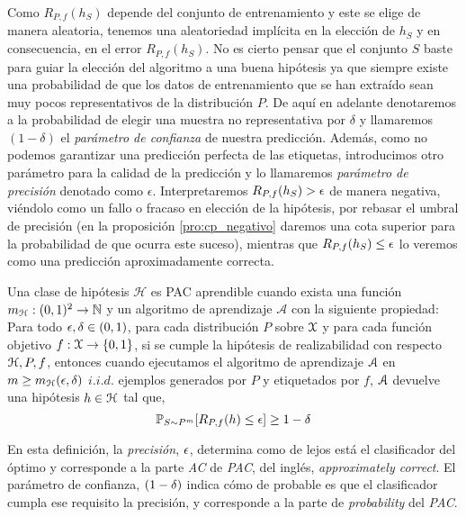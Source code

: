     Como $R_{P,f}(h_S)$ depende del conjunto de entrenamiento y este se elige de manera aleatoria, tenemos una aleatoriedad implícita en la elección de $h_S$ y en consecuencia, en el error $R_{P,f}(h_S)$. No es cierto pensar que el conjunto $S$ baste para guiar la elección del algoritmo a una buena hipótesis ya que siempre existe una probabilidad de que los datos de entrenamiento que se han extraído sean muy pocos representativos de la distribución $P$. De aquí en adelante denotaremos a la probabilidad de elegir una muestra no representativa por $\delta$ y llamaremos $(1-\delta)$ el \textit{parámetro de confianza} de nuestra predicción. Además, como no podemos garantizar una predicción perfecta de las etiquetas, introducimos otro parámetro para la calidad de la predicción y lo llamaremos \textit{parámetro de precisión} denotado como $\epsilon$. Interpretaremos $R_{P,f}(h_S) > \epsilon$ de manera negativa, viéndolo como un fallo o fracaso en elección de la hipótesis, por rebasar el umbral de precisión (en la proposición \ref{pro:cp_negativo} daremos una cota superior para la probabilidad de que ocurra este suceso), mientras que $R_{P,f}(h_S) \leq \epsilon$ lo veremos como una predicción aproximadamente correcta. \\
    
    
    
        \begin{definicion}
        Una clase de hipótesis $\mathcal{H}$ es PAC aprendible cuando exista una función $m_{\mathcal{H}}:(0,1)^2 \to \mathbb{N}$ y un algoritmo de aprendizaje $\mathcal{A}$ con la siguiente propiedad: Para todo $\epsilon, \delta \in (0,1)$, para cada distribución $P$ sobre $\mathcal{X}$ y para cada función objetivo $f:\mathcal{X} \to \{0,1\}$, si se cumple la hipótesis de realizabilidad con respecto $\mathcal{H}, P,f$, entonces cuando ejecutamos el algoritmo de aprendizaje $\mathcal{A}$ en $m\geq m_{\mathcal{H}}(\epsilon,\delta)$ $i.i.d.$ ejemplos generados por $P$ y etiquetados por $f$, $\mathcal{A}$ devuelve una hipótesis $h \in \mathcal{H}$ tal que,
            \begin{equation}
                \mathbb{P}_{S\sim P^m}[R_{P,f}(h) \leq \epsilon] \geq 1 - \delta
            \end{equation}
            
        \end{definicion}
        
    En esta definición, la \textit{precisión}, $\epsilon$, determina como de lejos está el clasificador del óptimo y corresponde a la parte \textit{AC} de \textit{PAC}, del inglés, \textit{approximately correct}. El parámetro de confianza, $(1-\delta)$ indica cómo de probable es que el clasificador cumpla ese requisito la precisión, y corresponde a la parte de \textit{probability} del \textit{PAC}. \\
    
